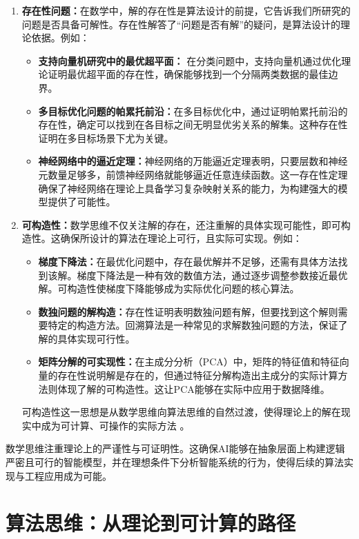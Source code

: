 \begin{enumerate}
\item  {\bf 存在性问题：}在数学中，解的存在性是算法设计的前提，它告诉我们所研究的问题是否具备可解性。存在性解答了“问题是否有解”的疑问，是算法设计的理论依据。例如：
\begin{itemize}
\item {\bf 支持向量机研究中的最优超平面：} 在分类问题中，支持向量机通过优化理论证明最优超平面的存在性，确保能够找到一个分隔两类数据的最佳边界。
\item {\bf 多目标优化问题的帕累托前沿：}在多目标优化中，通过证明帕累托前沿的存在性，确定可以找到在各目标之间无明显优劣关系的解集。这种存在性证明在多目标场景下尤为关键。
\item {\bf 神经网络中的逼近定理：}神经网络的万能逼近定理表明，只要层数和神经元数量足够多，前馈神经网络就能够逼近任意连续函数。这一存在性定理确保了神经网络在理论上具备学习复杂映射关系的能力，为构建强大的模型提供了可能性。
\end{itemize}

\item {\bf 可构造性：}数学思维不仅关注解的存在，还注重解的具体实现可能性，即可构造性。这确保所设计的算法在理论上可行，且实际可实现。例如：
\begin{itemize}
\item {\bf 梯度下降法：}在最优化问题中，存在最优解并不足够，还需有具体方法找到该解。梯度下降法是一种有效的数值方法，通过逐步调整参数接近最优解。可构造性使梯度下降能够成为实际优化问题的核心算法。
\item {\bf 数独问题的解构造：}存在性证明表明数独问题有解，但要找到这个解则需要特定的构造方法。回溯算法是一种常见的求解数独问题的方法，保证了解的具体实现可行性。
\item {\bf 矩阵分解的可实现性：}在主成分分析（PCA）中，矩阵的特征值和特征向量的存在性说明解是存在的，但通过特征分解构造出主成分的实际计算方法则体现了解的可构造性。这让PCA能够在实际中应用于数据降维。
\end{itemize}

可构造性这一思想是从数学思维向算法思维的自然过渡，使得理论上的解在现实中成为可计算、可操作的实际方法 。

\end{enumerate}

数学思维注重理论上的严谨性与可证明性。这确保AI能够在抽象层面上构建逻辑严密且可行的智能模型，并在理想条件下分析智能系统的行为，使得后续的算法实现与工程应用成为可能。

\section{ 算法思维：从理论到可计算的路径}

